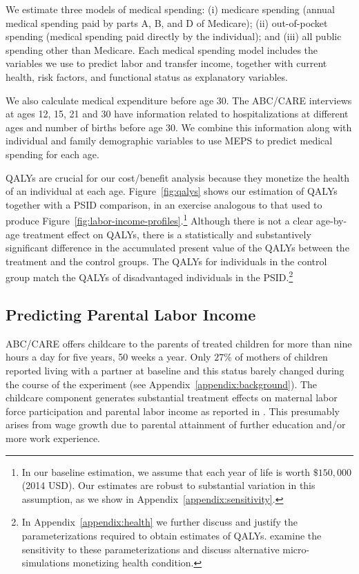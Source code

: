 We estimate three models of medical spending: (i) medicare spending (annual medical spending paid by parts A, B, and D of Medicare); (ii) out-of-pocket spending (medical spending paid directly by the individual); and (iii) all public spending other than Medicare. Each medical spending model includes the variables we use to predict labor and transfer income, together with current health, risk factors, and functional status as explanatory variables.

We also calculate medical expenditure before age 30. The ABC/CARE interviews at ages 12, 15, 21 and 30 have information related to hospitalizations at different ages and number of births before age 30. We combine this information along with individual and family demographic variables to use MEPS to predict medical spending for each age.

QALYs are crucial for our cost/benefit analysis because they monetize the health of an individual at each age. Figure~\ref{fig:qalys} shows our estimation of QALYs together with a PSID comparison, in an exercise analogous to that used to produce Figure~\ref{fig:labor-income-profiles}.\footnote{In our baseline estimation, we assume that each year of life is worth  $\$150,000$ (2014 USD). Our estimates are robust to substantial variation in this assumption, as we show in  Appendix~\ref{appendix:sensitivity}.} Although there is not a clear age-by-age treatment effect on QALYs, there is a statistically and substantively significant difference in the accumulated present value of the QALYs between the treatment and the control groups. The QALYs for individuals in the control group match the QALYs of disadvantaged individuals in the PSID.\footnote{In  Appendix~\ref{appendix:health} we further discuss and justify the parameterizations required to obtain estimates of QALYs. \citet{Goldman_etal_2015_Future-America-Model} examine the sensitivity to these parameterizations and discuss alternative micro-simulations monetizing health condition.}

\subsection{Predicting Parental Labor Income} \label{section:pincome}

ABC/CARE offers childcare to the parents of treated children for more than nine hours a day for five years, 50 weeks a year. Only $27\%$ of mothers of children reported living with a partner at baseline and this status barely changed during the course of the experiment (see Appendix~\ref{appendix:background}). The childcare component generates substantial treatment effects on maternal labor force participation and parental labor income as reported in \cite{Garcia_Heckman_Ziff_2017_Gender-Diff_UNPUBLISHED}. This presumably arises from wage growth due to parental attainment of further education and/or more work experience.

